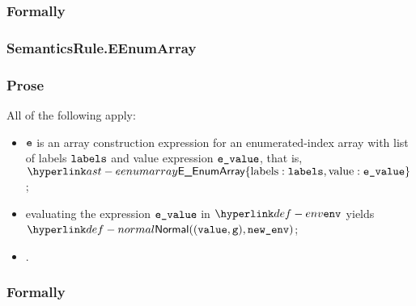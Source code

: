 \subsubsection{Formally}
\begin{mathpar}
\end{mathpar}

\subsubsection{SemanticsRule.EEnumArray}
\subsubsection{Prose}
All of the following apply:
\begin{itemize}
  \item $\ve$ is an array construction expression for an enumerated-index array with
        list of labels $\vlabels$ and value expression $\evalue$,
        that is, \\
        $\EEnumArray\{\EArrayLabels: \vlabels, \EArrayValue: \evalue\}$;
  \item evaluating the expression $\evalue$ in $\env$ yields $\Normal((\vvalue, \vg), \newenv)$\ProseOrAbnormal;
  \item {}.
\end{itemize}

\subsubsection{Formally}
\begin{mathpar}
\end{mathpar}

